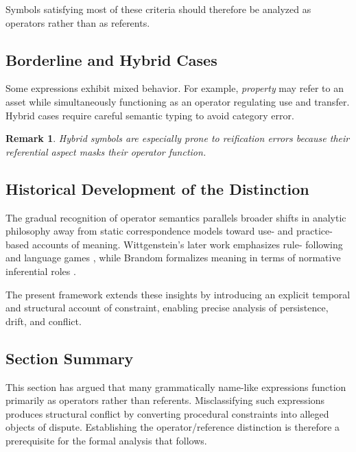 \documentclass[11pt]{article}
\newtheorem{remark}{Remark}
\begin{document}
Symbols satisfying most of these criteria should therefore be analyzed as
operators rather than as referents.

\subsection{Borderline and Hybrid Cases}

Some expressions exhibit mixed behavior. For example, \emph{property} may refer
to an asset while simultaneously functioning as an operator regulating use and
transfer. Hybrid cases require careful semantic typing to avoid category error.

\begin{remark}
Hybrid symbols are especially prone to reification errors because their
referential aspect masks their operator function.
\end{remark}

\subsection{Historical Development of the Distinction}

The gradual recognition of operator semantics parallels broader shifts in
analytic philosophy away from static correspondence models toward use- and
practice-based accounts of meaning. Wittgenstein’s later work emphasizes rule-
following and language games \cite{wittgenstein1953}, while Brandom formalizes
meaning in terms of normative inferential roles \cite{brandom1994}.

The present framework extends these insights by introducing an explicit temporal
and structural account of constraint, enabling precise analysis of persistence,
drift, and conflict.

\subsection{Section Summary}

This section has argued that many grammatically name-like expressions function
primarily as operators rather than referents. Misclassifying such expressions
produces structural conflict by converting procedural constraints into alleged
objects of dispute. Establishing the operator/reference distinction is therefore
a prerequisite for the formal analysis that follows.
\end{document}
